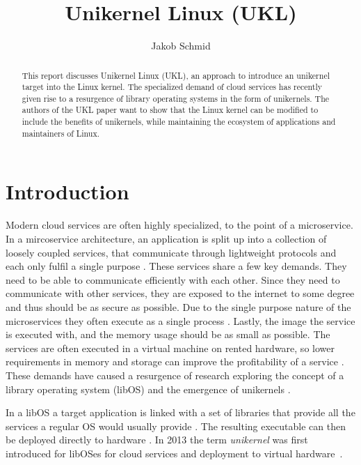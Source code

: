 \documentclass[10pt,twocolumn,a4paper]{article}
\author{Jakob Schmid}
\begin{document}
\title{Unikernel Linux (UKL)}

\newcommand{\todo}[1]{{\texttt{[#1]}}}
\newcommand{\code}[1]{{\tt \small{#1}}}
\newcommand{\refsec}[1]{{§~\ref{#1}}}

\maketitle

\begin{abstract}
  This report discusses Unikernel Linux (UKL), an approach to introduce an
  unikernel target into the Linux kernel.
  The specialized demand of cloud services has recently given rise
  to a resurgence of library operating systems in the form of unikernels.
  The authors of the UKL paper want to show that the Linux kernel can be
  modified to include the benefits of unikernels, while maintaining the
  ecosystem of applications and maintainers of Linux.
\end{abstract}

\section{Introduction}\label{sec:introduction}
  Modern cloud services are often highly specialized, to the point of a microservice.
  In a mircoservice architecture, an application is split up into a collection of loosely coupled services,
  that communicate through lightweight protocols and each only fulfil a single purpose \cite{madhavapeddy13-2}.
  These services share a few key demands. They need to be able to communicate 
  efficiently with each other. Since they need to communicate with other services,
  they are exposed to the internet to some degree and thus should be as secure as possible.
  Due to the single purpose nature of the microservices they often execute as a single process \cite{raza19}.
  Lastly, the image the service is executed with, and the memory usage should be as small as possible.
  The services are often executed in a virtual machine on rented hardware, so lower requirements
  in memory and storage can improve the profitability of a service \cite{madhavapeddy13}.
  These demands have caused a resurgence of research exploring the concept of 
  a library operating system (libOS) and the emergence of unikernels \cite{madhavapeddy13-2}. 

  In a libOS a target application is linked with a set of
  libraries that provide all the services a regular OS would usually provide \cite{madhavapeddy13-2}.
  The resulting executable can then be deployed directly to hardware \cite{raza19}.
  In 2013 the term \textit{unikernel} was first introduced for libOSes
  for cloud services and deployment to virtual hardware~\cite{madhavapeddy13}.
\end{document}
